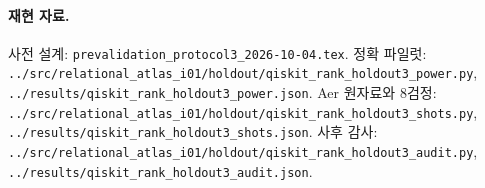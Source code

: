 \documentclass[11pt,a4paper]{article}
\begin{document}
\paragraph{재현 자료.}
사전 설계: \texttt{prevalidation\_protocol3\_2026-10-04.tex}.
정확 파일럿: \texttt{../src/relational\_atlas\_i01/holdout/qiskit\_rank\_holdout3\_power.py},
\texttt{../results/qiskit\_rank\_holdout3\_power.json}.
Aer 원자료와 8검정:
\texttt{../src/relational\_atlas\_i01/holdout/qiskit\_rank\_holdout3\_shots.py},
\texttt{../results/qiskit\_rank\_holdout3\_shots.json}.
사후 감사:
\texttt{../src/relational\_atlas\_i01/holdout/qiskit\_rank\_holdout3\_audit.py},
\texttt{../results/qiskit\_rank\_holdout3\_audit.json}.
\end{document}
